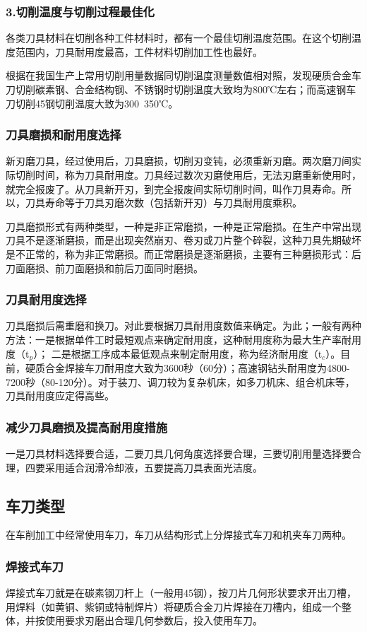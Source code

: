 \documentclass{ctexbook}
\begin{document}
\subsubsection{3.切削温度与切削过程最佳化}
各类刀具材料在切削各种工件材料时，都有一个最佳切削温度范围。在这个切削温度范围内，刀具耐用度最高，工件材料切削加工性也最好。

根据在我国生产上常用切削用量数据同切削温度测量数值相对照，发现硬质合金车刀切削碳素钢、合金结构钢、不锈钢时切削温度大致均为800℃左右；而高速钢车刀切削45钢切削温度大致为300~350℃。
\subsubsection{刀具磨损和耐用度选择}
新刃磨刀具，经过使用后，刀具磨损，切削刃变钝，必须重新刃磨。两次磨刀间实际切削时间，称为刀具耐用度。刀具经过数次刃磨使用后，无法刃磨重新使用时，就完全报废了。从刀具新开刃，到完全报废间实际切削时间，叫作刀具寿命。所以，刀具寿命等于刀具刃磨次数（包括新开刃）与刀具耐用度乘积。

刀具磨损形式有两种类型，一种是非正常磨损，一种是正常磨损。在生产中常出现刀具不是逐渐磨损，而是出现突然崩刃、卷刃或刀片整个碎裂，这种刀具先期破坏是不正常的，称为非正常磨损。而正常磨损是逐渐磨损，主要有三种磨损形式：后刀面磨损、前刀面磨损和前后刀面同时磨损。
\subsubsection{刀具耐用度选择}
刀具磨损后需重磨和换刀。对此要根据刀具耐用度数值来确定。为此；一般有两种方法：一是根据单件工时最短观点来确定耐用度，这种耐用度称为最大生产率耐用度（t$_{p}$）；
二是根据工序成本最低观点来制定耐用度，称为经济耐用度（t$_{c}$）。目前，硬质合金焊接车刀耐用度大致为3600秒（60分）；高速钢钻头耐用度为4800-7200秒（80-120分）。对于装刀、调刀较为复杂机床，如多刀机床、组合机床等，刀具耐用度应定得高些。
\subsubsection{减少刀具磨损及提高耐用度措施}
一是刀具材料选择要合适，二要刀具几何角度选择要合理，三要切削用量选择要合理，四要采用适合润滑冷却液，五要提高刀具表面光洁度。
\subsection{车刀类型}
在车削加工中经常使用车刀，车刀从结构形式上分焊接式车刀和机夹车刀两种。
\subsubsection{焊接式车刀}
焊接式车刀就是在碳素钢刀杆上（一般用45钢），按刀片几何形状要求开出刀槽，用焊料（如黄铜、紫铜或特制焊片）将硬质合金刀片焊接在刀槽内，组成一个整体，并按使用要求刃磨出合理几何参数后，投入使用车刀。
\end{document}
